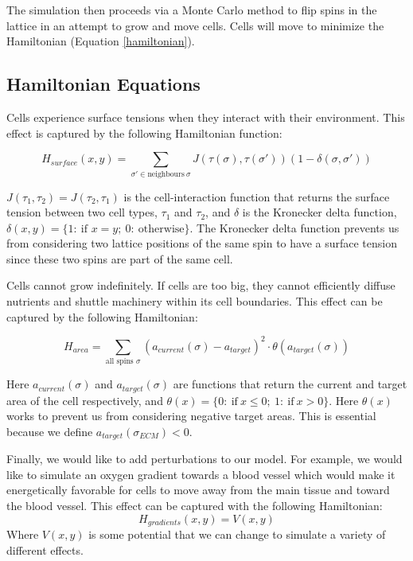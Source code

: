 \documentclass[12pt]{article}
\begin{document}
The simulation then proceeds via a Monte Carlo method to flip spins in the lattice in an attempt to grow and move cells. Cells will move to minimize the Hamiltonian (Equation \ref{hamiltonian}).

\subsection{Hamiltonian Equations}
Cells experience surface tensions when they interact with their environment. This effect is captured by the following Hamiltonian function:

\begin{equation}
	H_{surface} (x,y) = \sum_{\sigma' \in \text{neighbours}~\sigma} J(\tau(\sigma), \tau(\sigma'))(1-\delta(\sigma, \sigma'))
\end{equation}

$J(\tau_1, \tau_2)=J(\tau_2, \tau_1)$ is the cell-interaction function that returns the surface tension between two cell types, $\tau_1$ and $\tau_2$, and $\delta$ is the Kronecker delta function, $\delta(x,y)=\{1:~\text{if }x=y;~0:~\text{otherwise}\}$. The Kronecker delta function prevents us from considering two lattice positions of the same spin to have a surface tension since these two spins are part of the same cell.

Cells cannot grow indefinitely. If cells are too big, they cannot efficiently diffuse nutrients and shuttle machinery within its cell boundaries. This effect can be captured by the following Hamiltonian:

\begin{equation}
	H_{area} = \sum_{\text{all spins }\sigma} (a_{current}(\sigma)-a_{target})^2 \cdot \theta(a_{target}(\sigma))
	\label{H_area}
\end{equation}

Here $a_{current}(\sigma)$ and $a_{target}(\sigma)$ are functions that return the current and target area of the cell respectively, and $\theta(x)=\{0:~\text{if}~x\leq 0;~1:~\text{if}~x>0\}$. Here $\theta(x)$ works to prevent us from considering negative target areas. This is essential because we define $a_{target}(\sigma_{ECM}) < 0$.

Finally, we would like to add perturbations to our model. For example, we would like to simulate an oxygen gradient towards a blood vessel which would make it energetically favorable for cells to move away from the main tissue and toward the blood vessel. This effect can be captured with the following Hamiltonian:
\begin{equation}
	H_{gradients}(x,y) = V(x,y)
\end{equation}
Where $V(x,y)$ is some potential that we can change to simulate a variety of different effects.
\end{document}
